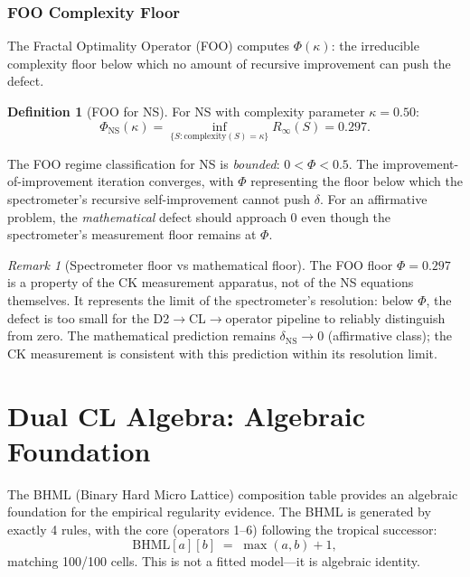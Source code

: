 \documentclass[11pt]{article}
\theoremstyle{definition}
\newtheorem{definition}[theorem]{Definition}
\theoremstyle{remark}
\newtheorem{remark}[theorem]{Remark}
\begin{document}
\subsubsection{FOO Complexity Floor}
\label{sec:foo-ns}

The Fractal Optimality Operator (FOO) computes $\Phi(\kappa)$: the irreducible
complexity floor below which no amount of recursive improvement can push the
defect.

\begin{definition}[FOO for NS]
\label{def:foo-ns}
For NS with complexity parameter $\kappa = 0.50$:
\begin{equation}\label{eq:foo-ns}
  \Phi_{\mathrm{NS}}(\kappa) = \inf_{\{S : \mathrm{complexity}(S) = \kappa\}}
  R_\infty(S) = 0.297.
\end{equation}
\end{definition}

The FOO regime classification for NS is \emph{bounded}: $0 < \Phi < 0.5$.
The improvement-of-improvement iteration converges, with $\Phi$ representing the
floor below which the spectrometer's recursive self-improvement cannot push
$\delta$.  For an affirmative problem, the \emph{mathematical} defect should
approach $0$ even though the spectrometer's measurement floor remains at $\Phi$.

\begin{remark}[Spectrometer floor vs mathematical floor]
The FOO floor $\Phi = 0.297$ is a property of the CK measurement apparatus,
not of the NS equations themselves.  It represents the limit of the
spectrometer's resolution: below $\Phi$, the defect is too small for the
D2$\to$CL$\to$operator pipeline to reliably distinguish from zero.  The
mathematical prediction remains $\delta_{\mathrm{NS}} \to 0$ (affirmative
class); the CK measurement is consistent with this prediction within
its resolution limit.
\end{remark}

\section{Dual CL Algebra: Algebraic Foundation}
\label{sec:dual-cl-algebra}

The BHML (Binary Hard Micro Lattice) composition table provides an algebraic
foundation for the empirical regularity evidence.  The BHML is generated by
exactly 4 rules, with the core (operators 1--6) following the tropical
successor:
\[
  \mathrm{BHML}[a][b] \;=\; \max(a,b) + 1,
\]
matching 100/100 cells.  This is not a fitted model---it is algebraic identity.
\end{document}
